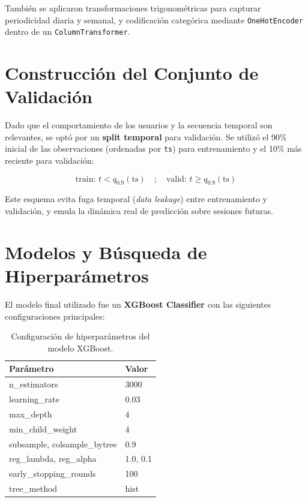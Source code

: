 \documentclass[12pt,a4paper]{article}
\begin{document}
También se aplicaron transformaciones trigonométricas para capturar periodicidad diaria y semanal, y codificación categórica mediante \texttt{OneHotEncoder} dentro de un \texttt{ColumnTransformer}.


\section{Construcción del Conjunto de Validación}

Dado que el comportamiento de los usuarios y la secuencia temporal son relevantes, se optó por un \textbf{split temporal} para validación.  
Se utilizó el 90\% inicial de las observaciones (ordenadas por \texttt{ts}) para entrenamiento y el 10\% más reciente para validación:

\[ \text{train: } t < q_{0.9}(\text{ts}) \quad ; \quad \text{valid: } t \ge q_{0.9}(\text{ts}) \]

Este esquema evita fuga temporal (\textit{data leakage}) entre entrenamiento y validación, y emula la dinámica real de predicción sobre sesiones futuras.


\section{Modelos y Búsqueda de Hiperparámetros}

El modelo final utilizado fue un \textbf{XGBoost Classifier} con las siguientes configuraciones principales:

\begin{table}[H]
\centering
\begin{tabular}{ll}
\toprule
\textbf{Parámetro} & \textbf{Valor} \\
\midrule
n\_estimators & 3000 \\
learning\_rate & 0.03 \\
max\_depth & 4 \\
min\_child\_weight & 4 \\
subsample, colsample\_bytree & 0.9 \\
reg\_lambda, reg\_alpha & 1.0, 0.1 \\
early\_stopping\_rounds & 100 \\
tree\_method & hist \\
\bottomrule
\end{tabular}
\caption{Configuración de hiperparámetros del modelo XGBoost.}
\end{table}
\end{document}
